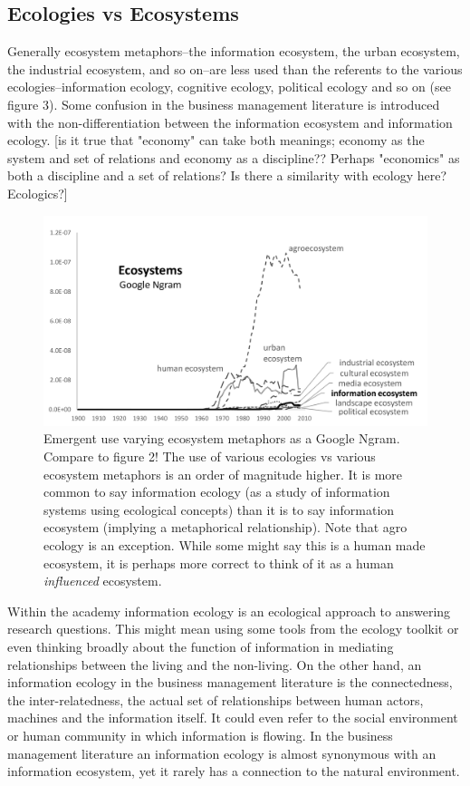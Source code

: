 \subsection{Ecologies vs Ecosystems}

Generally ecosystem metaphors--the information ecosystem, the urban ecosystem, the industrial ecosystem, and so on--are less used than the referents to the various ecologies--information ecology, cognitive ecology, political ecology and so on (see figure 3). Some confusion in the business management literature is introduced with the non-differentiation between the information ecosystem and information ecology. [is it true that "economy" can take both meanings; economy as the system and set of relations and economy as a discipline?? Perhaps "economics" as both a discipline and a set of relations? Is there a similarity with ecology here? Ecologics?]

\begin{figure}[!ht]
  \centering
    \includegraphics[width=5.5in]{figures/ecosystemsAll}
  \caption{Emergent use varying ecosystem metaphors as a Google Ngram. Compare to figure 2! The use of various ecologies vs various ecosystem metaphors is an order of magnitude higher. It is more common to say information ecology (as a study of information systems using ecological concepts) than it is to say information ecosystem (implying a metaphorical relationship). Note that agro ecology is an exception. While some might say this is a human made ecosystem, it is perhaps more correct to think of it as a human \textit{influenced} ecosystem.}
\end{figure}

Within the academy information ecology is an ecological approach to answering research questions. This might mean using some tools from the ecology toolkit or even thinking broadly about the function of information in mediating relationships between the living and the non-living. On the other hand, an information ecology in the business management literature is the connectedness, the inter-relatedness, the actual set of relationships between human actors, machines and the information itself. It could even refer to the social environment or human community in which information is flowing. In the business management literature an information ecology is almost synonymous with an information ecosystem, yet it rarely has a connection to the natural environment.
